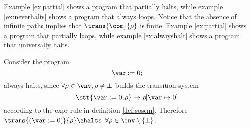 Example \ref{ex:partial} shows a program that partially halts, while
example \ref{ex:neverhalts} shows a program that always loops.  Notice
that the absence of infinite paths implies that \(\trans{\com}{\rho}\)
is finite.  Example \ref{ex:partial} shows a program that partially
loops, while example \ref{ex:alwayshalt} shows a program that
universally halts.


\begin{example}\label{ex:alwayshalt}
  Consider the program
  \begin{equation*}
    \var := 0;
  \end{equation*}
  always halts, since \(\forall\rho \in \env, \rho \neq \bot\) builds
  the transition system \[\stt{\var := 0, \rho} \to \rho[\var \mapsto
    0]\] according to the expr rule in definition
  \ref{def:sosem}. Therefore \(\trans{(\var := 0)}{\rho} \ahalts\)
  \(\forall \rho \in \env\setminus\{\bot\}\).
\end{example}


